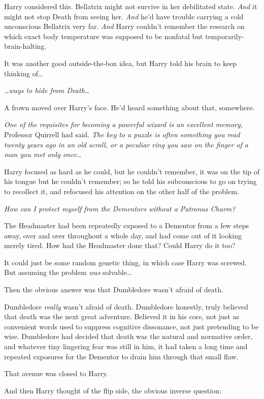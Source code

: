 Harry considered this. Bellatrix might not survive in her debilitated
state. \emph{And} it might not stop Death from seeing her. \emph{And}
he'd have trouble carrying a cold unconscious Bellatrix very far.
\emph{And} Harry couldn't remember the research on which exact body
temperature was supposed to be nonfatal but temporarily-brain-halting.

It was another good outside-the-box idea, but Harry told his brain to
keep thinking of\ldots{}

\emph{\ldots{}ways to hide from Death\ldots{}}

A frown moved over Harry's face. He'd heard something about that,
somewhere.

\emph{One of the requisites for becoming a powerful wizard is an
excellent memory,} Professor Quirrell had said. \emph{The key to a
puzzle is often something you read twenty years ago in an old scroll, or
a peculiar ring you saw on the finger of a man you met only
once\ldots{}}

Harry focused as hard as he could, but he couldn't remember, it was on
the tip of his tongue but he couldn't remember; so he told his
subconscious to go on trying to recollect it, and refocused his
attention on the other half of the problem.

\emph{How can I protect myself from the Dementors without a Patronus
Charm?}

The Headmaster had been repeatedly exposed to a Dementor from a few
steps away, over and over throughout a whole day, and had come out of it
looking merely tired. How had the Headmaster done that? Could Harry do
it too?

It could just be some random genetic thing, in which case Harry was
screwed. But assuming the problem \emph{was} solvable\ldots{}

Then the obvious answer was that Dumbledore wasn't afraid of death.

Dumbledore \emph{really} wasn't afraid of death. Dumbledore honestly,
truly believed that death was the next great adventure. Believed it in
his core, not just as convenient words used to suppress cognitive
dissonance, not just pretending to be wise. Dumbledore had decided that
death was the natural and normative order, and whatever tiny lingering
fear was still in him, it had taken a long time and repeated exposures
for the Dementor to drain him through that small flaw.

That avenue was closed to Harry.

And then Harry thought of the flip side, the obvious inverse question:

